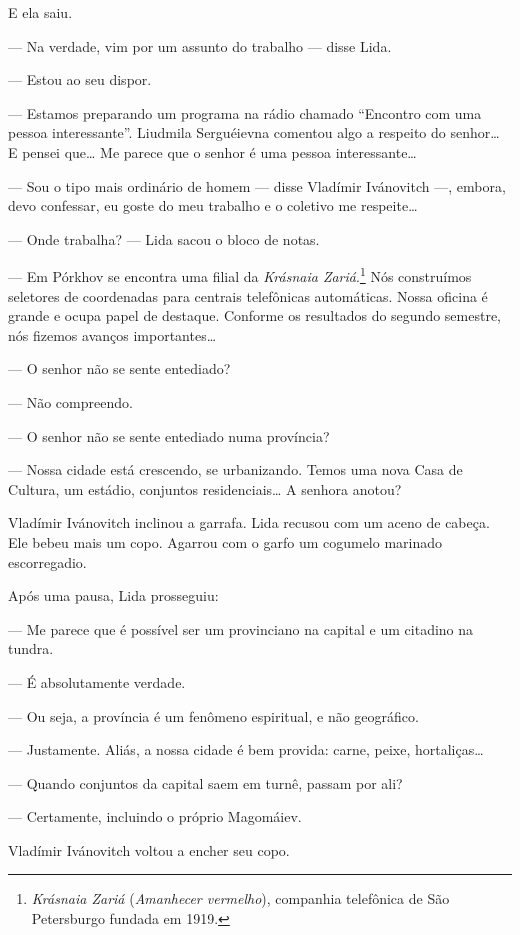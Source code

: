 E ela saiu.

--- Na verdade, vim por um assunto do trabalho --- disse Lida.

--- Estou ao seu dispor.

--- Estamos preparando um programa na rádio chamado ``Encontro com uma
pessoa interessante''. Liudmila Serguéievna comentou algo a respeito do
senhor\ldots{} E pensei que\ldots{} Me parece que o senhor é uma pessoa
interessante\ldots{}

--- Sou o tipo mais ordinário de homem --- disse Vladímir Ivánovitch
---, embora, devo confessar, eu goste do meu trabalho e o coletivo me
respeite\ldots{}

--- Onde trabalha? --- Lida sacou o bloco de notas.

--- Em Pórkhov se encontra uma filial da \emph{Krásnaia
Zariá}.\footnote{\emph{Krásnaia Zariá} (\emph{Amanhecer vermelho}),
  companhia telefônica de São Petersburgo fundada em 1919.} Nós
construímos seletores de coordenadas para centrais telefônicas
automáticas. Nossa oficina é grande e ocupa papel de destaque. Conforme
os resultados do segundo semestre, nós fizemos avanços importantes\ldots{}

--- O senhor não se sente entediado?

--- Não compreendo.

--- O senhor não se sente entediado numa província?

--- Nossa cidade está crescendo, se urbanizando. Temos uma nova Casa de
Cultura, um estádio, conjuntos residenciais\ldots{} A senhora anotou?

Vladímir Ivánovitch inclinou a garrafa. Lida recusou com um aceno de
cabeça. Ele bebeu mais um copo. Agarrou com o garfo um cogumelo marinado
escorregadio.

Após uma pausa, Lida prosseguiu:

--- Me parece que é possível ser um provinciano na capital e um citadino
na tundra.

--- É absolutamente verdade.

--- Ou seja, a província é um fenômeno espiritual, e não geográfico.

--- Justamente. Aliás, a nossa cidade é bem provida: carne, peixe,
hortaliças\ldots{}

--- Quando conjuntos da capital saem em turnê, passam por ali?

--- Certamente, incluindo o próprio Magomáiev.

Vladímir Ivánovitch voltou a encher seu copo.

